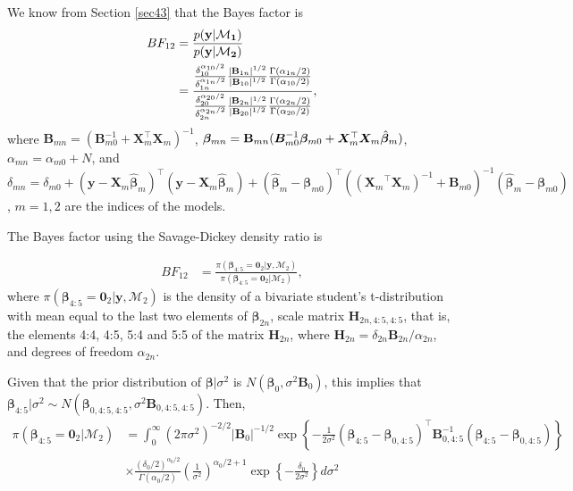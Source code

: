 We know from Section \ref{sec43} that the Bayes factor is
\begin{align*}
	BF_{12}&=\frac{p(\bf{y}|\mathcal{M}_1)}{p(\bf{y}|\mathcal{M}_2)}\\
	&=\frac{\frac{\delta_{10}^{\alpha_{10}/2}}{\delta_{1n}^{\alpha_{1n}/2}}\frac{|{\bf{B}}_{1n}|^{1/2}}{|{\bf{B}}_{10}|^{1/2}}\frac{\Gamma(\alpha_{1n}/2)}{\Gamma(\alpha_{10}/2)}}{\frac{\delta_{20}^{\alpha_{20}/2}}{\delta_{2n}^{\alpha_{2n}/2}}\frac{|{\bf{B}}_{2n}|^{1/2}}{|{\bf{B}}_{20}|^{1/2}}\frac{\Gamma(\alpha_{2n}/2)}{\Gamma(\alpha_{20}/2)}},
\end{align*}
where  ${{\bm{B}}}_{mn} = ({\bm{B}}_{m0}^{-1} + {\bm{X}}_m^{\top}{\bm{X}}_m)^{-1}$, $\bm{\beta}_{mn} = {{\bf{B}}}_{mn}({\bm{B}}_{m0}^{-1}\bm{\beta}_{m0} + {\bm{X}}_m^{\top}{\bm{X}}_m\hat{\bm{\beta}}_m)$, $\alpha_{mn}=\alpha_{m0}+N$, and $\delta_{mn}=\delta_{m0}+({\bm{y}}-{\bm{X}}_m\hat{\bm{\beta}}_m)^{\top}({\bm{y}}-{\bm{X}}_m\hat{\bm{\beta}}_m)+(\hat{\bm{\beta}}_m-\bm{\beta}_{m0})^{\top}(({\bm{X}_m}^{\top}{\bm{X}_m})^{-1}+{\bm{B}}_{m0})^{-1}(\hat{\bm{\beta}}_m-\bm{\beta}_{m0})$, $m=1,2$ are the indices of the models.

The Bayes factor using the Savage-Dickey density ratio is

\begin{align*}
	BF_{12}&=\frac{\pi(\bm{\beta}_{4:5}=\bm{0}_2|\bm{y},\mathcal{M}_2)}{\pi(\bm{\beta}_{4:5}=\bm{0}_2|\mathcal{M}_2)},
\end{align*}
where $\pi(\bm{\beta}_{4:5}=\bm{0}_2|\bm{y},\mathcal{M}_2)$ is the density of a bivariate student's t-distribution with mean equal to the last two elements of $\bm{\beta}_{2n}$, scale matrix $\bm{H}_{2n,4:5,4:5}$, that is, the elements 4:4, 4:5, 5:4 and 5:5 of the matrix $\bm{H}_{2n}$, where $\bm{H}_{2n}=\delta_{2n}\bm{B}_{2n}/\alpha_{2n}$, and degrees of freedom $\alpha_{2n}$.

Given that the prior distribution of $\bm{\beta}|\sigma^2$ is $N(\bm{\beta}_0,\sigma^2\bm{B}_0)$, this implies that $\bm{\beta}_{4:5}|\sigma^2\sim N(\bm{\beta}_{0,4:5,4:5},\sigma^2\bm{B}_{0,4:5,4:5})$. Then,
\begin{align*}
	\pi(\bm{\beta}_{4:5}=\bm{0}_2|\mathcal{M}_2)&=\int_{0}^{\infty}(2\pi\sigma^2)^{-2/2}|\bm{B}_0|^{-1/2}\exp\left\{-\frac{1}{2\sigma^2}(\bm{\beta}_{4:5}-\bm{\beta}_{0,4:5})^{\top}\bm{B}_{0,4:5}^{-1}(\bm{\beta}_{4:5}-\bm{\beta}_{0,4:5})\right\}\\
	&\times \frac{(\delta_0/2)^{\alpha_0/2}}{\Gamma(\alpha_0/2)}\left(\frac{1}{\sigma^2}\right)^{\alpha_0/2+1}\exp \left\{-\frac{\delta_0}{2\sigma^2} \right\}d\sigma^2
\end{align*}


